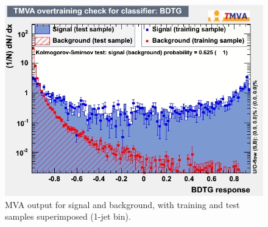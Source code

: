 \begin{figure}[!hbtp]
\begin{center}
\includegraphics[width=.6\textwidth]{figures/mvaout_jae_1j_log.png}
\caption{MVA output for signal and background, with training and test samples superimposed (1-jet bin).}
\label{fig:mvaout_jae_1j_log}
\end{center}
\end{figure}

